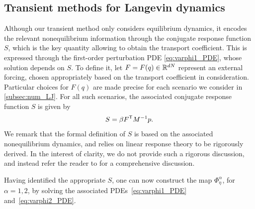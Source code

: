 %
\subsection{Transient methods for Langevin dynamics}
\label{subsec:num_lang}
%
%

Although our transient method only considers equilibrium dynamics, it encodes the relevant nonequilibrium information through the conjugate  response function $S$, which is the key quantity allowing to obtain the transport coefficient. This is expressed through the first-order perturbation PDE \eqref{eq:varphi1_PDE}, whose solution depends on $S$. To define it, let $F = F(q) \in \mathbb{R}^{dN}$ represent an external forcing, chosen appropriately based on the transport coefficient in consideration.  Particular choices for $F(q)$ are made precise for each scenario we consider in \cref{subsec:num_LJ}. For all such scenarios, the associated conjugate response function $S$ is given by
%
\begin{equation}
    S = \beta F^\mathsf T M^{-1} p.
    \label{eq:conj_res}
\end{equation}
%
We remark that the formal definition of $S$ is based on the associated nonequilibrium dynamics, and relies on linear response theory to be rigorously derived. In the interest of clarity, we do not provide such a rigorous discussion, and instead refer the reader to \cite[Section 5.2.3]{acta_numerica2016} for a comprehensive discussion.

Having identified the appropriate $S$, one can now construct the map $\Phi_\eta^\alpha$, for $\alpha=1,2$, by solving the associated PDEs~\eqref{eq:varphi1_PDE} and~\eqref{eq:varphi2_PDE}. 
%
%

